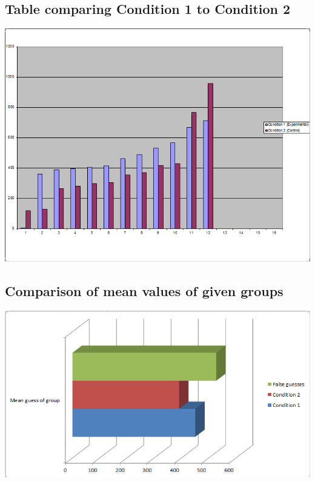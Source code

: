 \documentclass{report}
\begin{document}
\subsection{Table comparing Condition 1 to Condition 2}
\includegraphics[width=\textwidth]{table1}
\subsection{Comparison of mean values of given groups}
\includegraphics[width=\textwidth]{table2}
\end{document}
